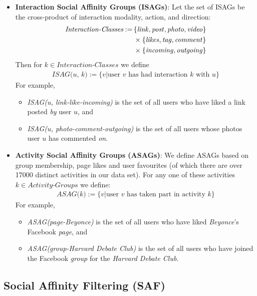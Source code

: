 \begin{itemize}
  \item \textbf{Interaction Social Affinity Groups (ISAGs)}: Let the set of
  ISAGs be the cross-product of interaction
  modality, action, and direction:
  \begin{align*}
  	\textit{Interaction-Classes} := \, & \{\link, \post, \photo, \video\} \\
                                           & \times \{\like, \ttag, \comment\} \\
                                           & \times \{\incoming, \outgoing\}
  \end{align*}
  Then for $k \in \textit{Interaction-Classes}$ we define 
  \begin{align*}
     \textit{ISAG(u, k)} := \{ v | \textrm{user $v$ has had interaction $k$ with $u$} \}
  \end{align*}
  For example,
  \begin{itemize}
     \item \textit{ISAG(u, link-like-incoming)} is the set of all users who
     have liked a link posted \emph{by} user $u$, and 
     \item \textit{ISAG(u, photo-comment-outgoing)} is the set of all users whose photos
     user $u$ has commented \emph{on}.
  \end{itemize}
\item \textbf{Activity Social Affinity Groups (ASAGs)}: We define
  ASAGs based on group membership, page likes and user favourites (of
  which there are over 17000 distinct activities in our data set).  For any one of
  these activities $k \in \textit{Activity-Groups}$ we define:
  \begin{align*}
     \textit{ASAG(k)} := \{ v | \textrm{user $v$ has taken part in activity $k$} \}
  \end{align*}
  For example,
  \begin{itemize}
     \item \textit{ASAG(page-Beyonce)} is the set of all users who 
     have liked \emph{Beyonce}'s Facebook \emph{page}, and 
     \item \textit{ASAG(group-Harvard Debate Club)} is the set of all users who 
     have joined the Facebook \emph{group} for the \emph{Harvard Debate Club}.
  \end{itemize}
\end{itemize}


\subsection{Social Affinity Filtering (SAF)}

